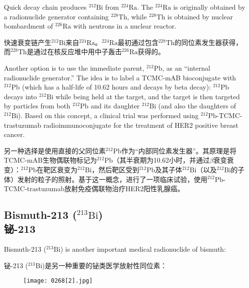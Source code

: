 \documentclass[dvipsnames, svgnames,a4paper,11pt]{article}
\begin{document}
Quick decay chain produces \(\mathrm{^{212}Bi}\) from \(\mathrm{^{224}Ra}\). The \(\mathrm{^{224}Ra}\) is originally obtained by a radionuclide generator containing \(\mathrm{^{228}Th}\), while \(\mathrm{^{228}Th}\) is obtained by nuclear bombardment of \(\mathrm{^{226}Ra}\) with neutrons in a nuclear reactor.  

快速衰变链产生\(\mathrm{^{212}Bi}\)来自\(\mathrm{^{224}Ra}\)。\(\mathrm{^{224}Ra}\)最初通过包含\(\mathrm{^{228}Th}\)的同位素发生器获得，而\(\mathrm{^{228}Th}\)是通过在核反应堆中用中子轰击\(\mathrm{^{226}Ra}\)获得的。  

Another option is to use the immediate parent, \(\mathrm{^{212}Pb}\), as an “internal radionuclide generator.” The idea is to label a TCMC-mAB bioconjugate with \(\mathrm{^{212}Pb}\) (which has a half-life of 10.62 hours and decays by beta decay): \(\mathrm{^{212}Pb}\) decays into \(\mathrm{^{212}Bi}\) while being held at the target, and the target is then targeted by particles from both \(\mathrm{^{212}Pb}\) and its daughter \(\mathrm{^{212}Bi}\) (and also the daughters of \(\mathrm{^{212}Bi}\)). Based on this concept, a clinical trial was performed using \(\mathrm{^{212}Pb}\)-TCMC-trastuzumab radioimmunoconjugate for the treatment of HER2 positive breast cancer.

另一种选择是使用直接的父同位素\(\mathrm{^{212}Pb}\)作为“内部同位素发生器”。其原理是将TCMC-mAB生物偶联物标记为\(\mathrm{^{212}Pb}\)（其半衰期为10.62小时，并通过$\beta$衰变衰变）：\(\mathrm{^{212}Pb}\)在靶区衰变为\(\mathrm{^{212}Bi}\)，然后靶区受到\(\mathrm{^{212}Pb}\)及其子体\(\mathrm{^{212}Bi}\)（以及\(\mathrm{^{212}Bi}\)的子体）发射的粒子的照射。基于这一概念，进行了一项临床试验，使用\(\mathrm{^{212}Pb}\)-TCMC-trastuzumab放射免疫偶联物治疗HER2阳性乳腺癌。


\subsection{Bismuth-213 (\(\mathrm{^{213}Bi}\)) \\铋-213}  
Bismuth-213 (\(\mathrm{^{213}Bi}\)) is another important medical radionuclide of bismuth:

铋-213 (\(\mathrm{^{213}Bi}\))是另一种重要的铋类医学放射性同位素：

\begin{figure}[h]
	\centering
    \texttt{[image: 0268[2].jpg]}  
     \label{fig359}
\end{figure}
\end{document}
